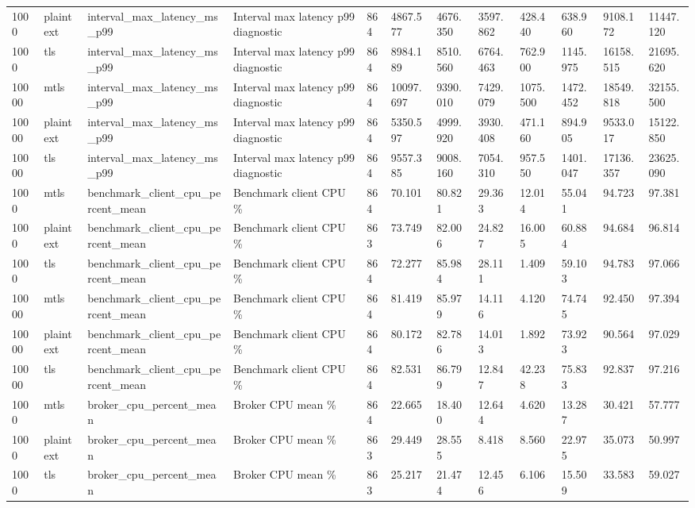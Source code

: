 \begin{longtable}{llllllllllll}
1000 & plaintext & interval\_max\_latency\_ms\_p99 & Interval max latency p99 diagnostic & 864 & 4867.577 & 4676.350 & 3597.862 & 428.440 & 638.960 & 9108.172 & 11447.120 \\
1000 & tls & interval\_max\_latency\_ms\_p99 & Interval max latency p99 diagnostic & 864 & 8984.189 & 8510.560 & 6764.463 & 762.900 & 1145.975 & 16158.515 & 21695.620 \\
10000 & mtls & interval\_max\_latency\_ms\_p99 & Interval max latency p99 diagnostic & 864 & 10097.697 & 9390.010 & 7429.079 & 1075.500 & 1472.452 & 18549.818 & 32155.500 \\
10000 & plaintext & interval\_max\_latency\_ms\_p99 & Interval max latency p99 diagnostic & 864 & 5350.597 & 4999.920 & 3930.408 & 471.160 & 894.905 & 9533.017 & 15122.850 \\
10000 & tls & interval\_max\_latency\_ms\_p99 & Interval max latency p99 diagnostic & 864 & 9557.385 & 9008.160 & 7054.310 & 957.550 & 1401.047 & 17136.357 & 23625.090 \\
1000 & mtls & benchmark\_client\_cpu\_percent\_mean & Benchmark client CPU \% & 864 & 70.101 & 80.821 & 29.363 & 12.014 & 55.041 & 94.723 & 97.381 \\
1000 & plaintext & benchmark\_client\_cpu\_percent\_mean & Benchmark client CPU \% & 863 & 73.749 & 82.006 & 24.827 & 16.005 & 60.884 & 94.684 & 96.814 \\
1000 & tls & benchmark\_client\_cpu\_percent\_mean & Benchmark client CPU \% & 864 & 72.277 & 85.984 & 28.111 & 1.409 & 59.103 & 94.783 & 97.066 \\
10000 & mtls & benchmark\_client\_cpu\_percent\_mean & Benchmark client CPU \% & 864 & 81.419 & 85.979 & 14.116 & 4.120 & 74.745 & 92.450 & 97.394 \\
10000 & plaintext & benchmark\_client\_cpu\_percent\_mean & Benchmark client CPU \% & 864 & 80.172 & 82.786 & 14.013 & 1.892 & 73.923 & 90.564 & 97.029 \\
10000 & tls & benchmark\_client\_cpu\_percent\_mean & Benchmark client CPU \% & 864 & 82.531 & 86.799 & 12.847 & 42.238 & 75.833 & 92.837 & 97.216 \\
1000 & mtls & broker\_cpu\_percent\_mean & Broker CPU mean \% & 864 & 22.665 & 18.400 & 12.644 & 4.620 & 13.287 & 30.421 & 57.777 \\
1000 & plaintext & broker\_cpu\_percent\_mean & Broker CPU mean \% & 863 & 29.449 & 28.555 & 8.418 & 8.560 & 22.975 & 35.073 & 50.997 \\
1000 & tls & broker\_cpu\_percent\_mean & Broker CPU mean \% & 863 & 25.217 & 21.474 & 12.456 & 6.106 & 15.509 & 33.583 & 59.027 \\

\end{longtable}
